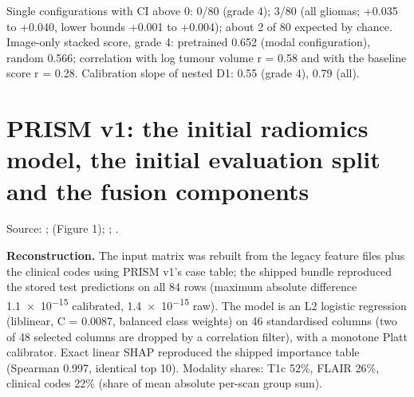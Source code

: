 \documentclass[11pt,a4paper]{article}
\begin{document}
Single configurations with CI above 0: 0/80 (grade 4); 3/80 (all gliomas; +0.035 to +0.040, lower bounds
+0.001 to +0.004); about 2 of 80 expected by chance. Image-only stacked score, grade 4: pretrained 0.652
(modal configuration), random 0.566; correlation with log tumour volume r = 0.58 and with the baseline score r
= 0.28. Calibration slope of nested D1: 0.55 (grade 4), 0.79 (all).

\FloatBarrier
\section{PRISM v1: the initial radiomics model, the initial evaluation split and the fusion components}\label{sec:S7}

Source: ;
 (Figure 1);
;
.

\textbf{Reconstruction.} The input matrix was rebuilt from the legacy feature files plus the clinical codes
using PRISM v1's case table; the shipped bundle reproduced the stored test predictions on all 84 rows
(maximum absolute difference \num{1.1e-15} calibrated, \num{1.4e-15} raw). The model is an L2 logistic
regression (liblinear, C = 0.0087, balanced class weights) on 46 standardised columns (two of 48 selected
columns are dropped by a correlation filter), with a monotone Platt calibrator. Exact linear SHAP reproduced
the shipped importance table (Spearman 0.997, identical top 10). Modality shares: T1c 52\%, FLAIR 26\%,
clinical codes 22\% (share of mean absolute per-scan group sum).
\end{document}
